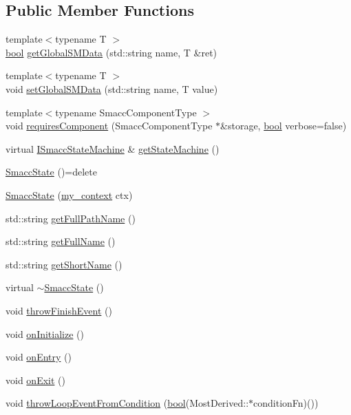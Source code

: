 \subsection*{Public Member Functions}
\begin{DoxyCompactItemize}
\item 
{\footnotesize template$<$typename T $>$ }\\\hyperlink{classbool}{bool} \hyperlink{classsmacc_1_1SmaccState_ad53b5be2760eb7ffb50f3b2e542b65f1}{get\+Global\+S\+M\+Data} (std\+::string name, T \&ret)
\item 
{\footnotesize template$<$typename T $>$ }\\void \hyperlink{classsmacc_1_1SmaccState_a98f2673b257479e0a3615d5d8279a591}{set\+Global\+S\+M\+Data} (std\+::string name, T value)
\item 
{\footnotesize template$<$typename Smacc\+Component\+Type $>$ }\\void \hyperlink{classsmacc_1_1SmaccState_a04f2f600546025915e32a305e5a86a72}{requires\+Component} (Smacc\+Component\+Type $\ast$\&storage, \hyperlink{classbool}{bool} verbose=false)
\item 
virtual \hyperlink{classsmacc_1_1ISmaccStateMachine}{I\+Smacc\+State\+Machine} \& \hyperlink{classsmacc_1_1SmaccState_afc39f8e0ca4001b2159a100da2fccd0e}{get\+State\+Machine} ()
\item 
\hyperlink{classsmacc_1_1SmaccState_a2fbeaca0f063a909d17de2c3040c8d17}{Smacc\+State} ()=delete
\item 
\hyperlink{classsmacc_1_1SmaccState_adc225018fe91da47e6e9f1d20150b26a}{Smacc\+State} (\hyperlink{structsmacc_1_1SmaccState_1_1my__context}{my\+\_\+context} ctx)
\item 
std\+::string \hyperlink{classsmacc_1_1SmaccState_a1a2ae90b80ba8ca88b4b9b66972abfbd}{get\+Full\+Path\+Name} ()
\item 
std\+::string \hyperlink{classsmacc_1_1SmaccState_a897dbdfe52a8b944d4bf1844ddcc3aa5}{get\+Full\+Name} ()
\item 
std\+::string \hyperlink{classsmacc_1_1SmaccState_a4db028a85244653e48957d2b3371413d}{get\+Short\+Name} ()
\item 
virtual \hyperlink{classsmacc_1_1SmaccState_a41b2515faf76648c6d69fe09108d2691}{$\sim$\+Smacc\+State} ()
\item 
void \hyperlink{classsmacc_1_1SmaccState_a56ccdfaf818ed6409dcbd4ab8b01c60e}{throw\+Finish\+Event} ()
\item 
void \hyperlink{classsmacc_1_1SmaccState_a49e958861b6ddbe9468e39c1919fde92}{on\+Initialize} ()
\item 
void \hyperlink{classsmacc_1_1SmaccState_a4a10a74fdbe51a798b8d651668b8ed9a}{on\+Entry} ()
\item 
void \hyperlink{classsmacc_1_1SmaccState_a82ca7c69153e86dc5eedf3f909560f3a}{on\+Exit} ()
\item 
void \hyperlink{classsmacc_1_1SmaccState_a4f3083a54914820cd7b9eb5a6221f29f}{throw\+Loop\+Event\+From\+Condition} (\hyperlink{classbool}{bool}(Most\+Derived\+::$\ast$condition\+Fn)())
\end{DoxyCompactItemize}
